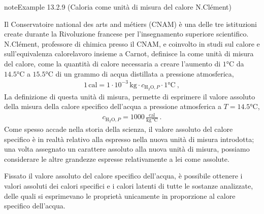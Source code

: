\documentclass[letterpaper,10pt,italian]{jupyterBook}
\begin{document}
\begin{sphinxadmonition}{note}{Example 13.2.9 (Caloria come unità di misura del calore \sphinxhyphen{} N.Clément)}



\sphinxAtStartPar
Il Conservatoire national des arts and métiers (CNAM) è una delle tre istituzioni create durante la Rivoluzione francese per l’insegnamento superiore scientifico. N.Clément, professore di chimica presso il CNAM, e coinvolto in studi sul calore e sull’equivalenza calore\sphinxhyphen{}lavoro insieme a Carnot, definisce la  come unità di misura del calore, come la quantità di calore necessaria a creare l’aumento di \(1 \text{°C}\) da \(14.5 \text{°C}\) a \(15.5 \text{°C}\) di un grammo di acqua distillata a pressione atmosferica,
\begin{equation*}
\begin{split}1 \, \text{cal} = 1 \cdot 10^{-3} \, \text{kg} \cdot c_{\text{H$_2$O},P} \cdot 1 \text{°C} \ ,\end{split}
\end{equation*}
\sphinxAtStartPar
La definizione di questa unità di misura, permette di esprimere il valore assoluto della misura della calore specifico dell’acqua a pressione atmosferica a \(T = 14.5 \text{°C}\),
\begin{equation*}
\begin{split}c_{\text{H$_2$O},P} = 1000 \, \frac{\text{cal}}{\text{kg} \, \text{°C}} \ .\end{split}
\end{equation*}
\sphinxAtStartPar
{} Come spesso accade nella storia della scienza, il valore assoluto del calore specifico è in realtà relativo alla \sphinxhyphen{} espresso nella \sphinxhyphen{} nuova unità di misura introdotta; una volta assegnato un carattere assoluto alla nuova unità di misura, possiamo considerare le altre grandezze espresse relativamente a lei come assolute.

\sphinxAtStartPar
{} Fissato il valore assoluto del calore specifico dell’acqua, è possibile ottenere i valori assoluti dei calori specifici e i calori latenti di tutte le sostanze analizzate, delle quali si esprimevano le proprietà unicamente in proporzione al calore specifico dell’acqua.
\end{sphinxadmonition}
\end{document}
